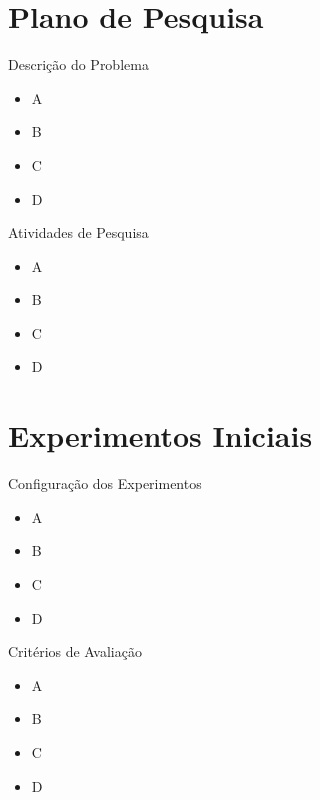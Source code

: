 \documentclass[10pt]{beamer}
\begin{document}
\section{Plano de Pesquisa}


\begin{frame}{Descrição do Problema}
    \begin{itemize}
        \item<1 -> A
        \item<2 -> B
        \item<3 -> C
        \item<4 -> D
      \end{itemize}
\end{frame}
 

\begin{frame}{Atividades de Pesquisa}
    \begin{itemize}
        \item<1 -> A
        \item<2 -> B
        \item<3 -> C
        \item<4 -> D
      \end{itemize}
\end{frame}

\section{Experimentos Iniciais}

\begin{frame}{Configuração dos Experimentos}
    \begin{itemize}
        \item<1 -> A
        \item<2 -> B
        \item<3 -> C
        \item<4 -> D
      \end{itemize}
\end{frame}

\begin{frame}{Critérios de Avaliação}
    \begin{itemize}
        \item<1 -> A
        \item<2 -> B
        \item<3 -> C
        \item<4 -> D
      \end{itemize}
\end{frame}
\end{document}
